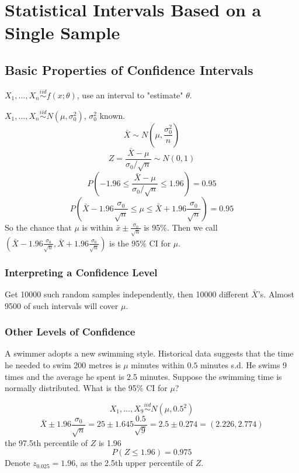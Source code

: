 \chapter{Statistical Intervals Based on a Single Sample}
\section{Basic Properties of Confidence Intervals}
$X_1,\dots,X_n \overset{iid}{\sim} f(x;\theta)$, use an interval to "estimate" $\theta$.

\begin{exmp}
$X_1,\dots,X_n \overset{iid}{\sim} N(\mu,\sigma_0^2)$, $\sigma_0^2$ known.
\[\bar{X}\sim N\left(\mu,\frac{\sigma_0^2}{n}\right)\]
\[Z=\frac{\bar{X}-\mu}{\sigma_0/\sqrt{n}}\sim N(0,1)\]
\[P\left(-1.96\leq \frac{\bar{X}-\mu}{\sigma_0/\sqrt{n}} \leq 1.96 \right) =0.95\]
\[P\left(\bar{X}-1.96 \frac{\sigma_0}{\sqrt{n}} \leq \mu \leq \bar{X}+1.96 \frac{\sigma_0}{\sqrt{n}} \right) =0.95\]
So the chance that $\mu$ is within $\bar{x}\pm \frac{\sigma_0}{\sqrt{n}} $ is 95\%. Then we call $\left(\bar{X}-1.96 \frac{\sigma_0}{\sqrt{n}},\bar{X}+1.96 \frac{\sigma_0}{\sqrt{n}} \right)$ is the 95\% CI for $\mu$.
\end{exmp}

\subsection{Interpreting a Confidence Level}
Get 10000 such random samples independently, then 10000 different $\bar{X}$'s. Almost 9500 of such intervals will cover $\mu$.

\subsection{Other Levels of Confidence}

\begin{exmp}
A swimmer adopts a new swimming style. Historical data suggests that the time he needed to swim 200 metres is $\mu$ minutes within $0.5$ minutes s.d. He swims 9 times and the average he spent is 2.5 minutes. Suppose the swimming time is normally distributed. What is the 95\% CI for $\mu$?

\[X_1,\dots,X_9 \overset{iid}{\sim} N(\mu,0.5^2)\]
\[\bar{X}\pm 1.96 \frac{\sigma_0}{\sqrt{n}}=25 \pm 1.645 \frac{0.5}{\sqrt{9}}=2.5 \pm 0.274=(2.226,2.774) \]
the 97.5th percentile of $Z$ is 1.96 
\[P(Z \leq 1.96)=0.975\]
Denote $z_{0.025}=1.96$, as the 2.5th upper percentile of $Z$.
\end{exmp}

